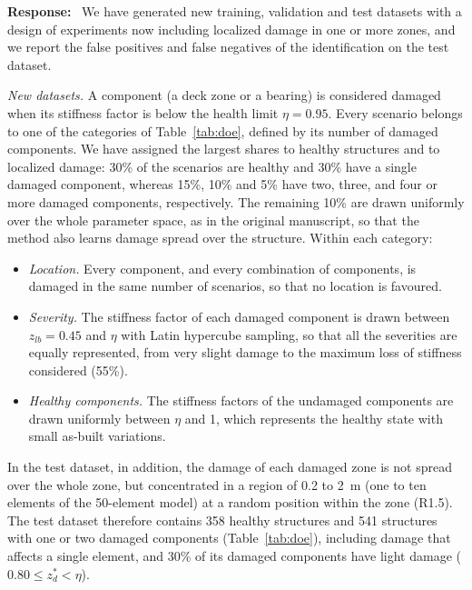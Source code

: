\documentclass[11pt]{article}
\newenvironment{response}{\par\smallskip\noindent\color{resp}\textbf{Response:}\ }{\par}
\begin{document}
\begin{response}
We have generated new training, validation and test datasets with a design of experiments now including localized damage in one or more zones, and we report the false positives and false negatives of the
identification on the test dataset.

\textit{New datasets.} A component (a deck zone or a bearing) is considered damaged when its stiffness factor is below
the health limit $\eta=0.95$. Every scenario belongs to one of the categories of Table~\ref{tab:doe}, defined by its
number of damaged components. We have assigned the largest shares to healthy structures and to localized damage: 30\% of
the scenarios are healthy and 30\% have a single damaged component, whereas 15\%, 10\% and 5\% have two, three, and four
or more damaged components, respectively. The remaining 10\% are drawn uniformly over the whole parameter space, as in
the original manuscript, so that the method also learns damage spread over the structure. Within each category:
\begin{itemize}[leftmargin=*]
\item \emph{Location.} Every component, and every combination of components, is damaged in the same number of
scenarios, so that no location is favoured.
\item \emph{Severity.} The stiffness factor of each damaged component is drawn between $z_{lb}=0.45$ and $\eta$ with
Latin hypercube sampling, so that all the severities are equally represented, from very slight damage to the maximum
loss of stiffness considered (55\%).
\item \emph{Healthy components.} The stiffness factors of the undamaged components are drawn uniformly between $\eta$
and 1, which represents the healthy state with small as-built variations.
\end{itemize}
In the test dataset, in addition, the damage of each damaged zone is not spread over the whole zone, but concentrated in a
region of 0.2 to 2~m (one to ten elements of the 50-element model) at a random position within the zone (R1.5). The test
dataset therefore contains 358 healthy structures and 541 structures with one or two damaged components
(Table~\ref{tab:doe}), including damage that affects a single element, and 30\% of its damaged components have light
damage ($0.80\le z_d^*<\eta$).


\end{response}
\end{document}
